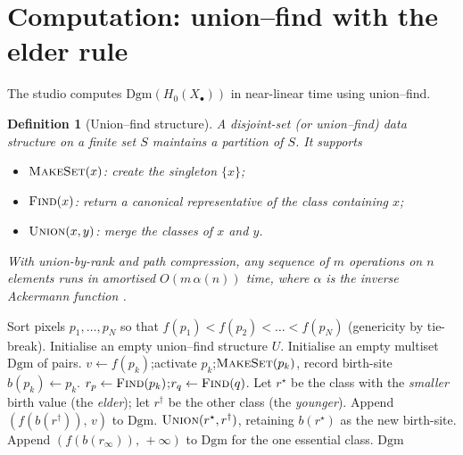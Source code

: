 \documentclass[11pt]{article}
\theoremstyle{persdef}
\newtheorem{definition}{Definition}[section]
\newcommand{\X}{X}
\newcommand{\PD}{\mathrm{Dgm}}
\newcommand{\Hk}[1]{H_{#1}}
\begin{document}
\section{Computation: union--find with the elder rule}

The studio computes $\PD(\Hk{0}(\X_\bullet))$ in near-linear time using union--find.

\begin{definition}[Union--find structure]\label{def:uf}
A \emph{disjoint-set} (or union--find) data structure on a finite set $S$ maintains a partition of $S$. It supports
\begin{itemize}[leftmargin=2em,itemsep=0.2em]
  \item $\textsc{MakeSet}(x)$: create the singleton $\{x\}$;
  \item $\textsc{Find}(x)$: return a canonical representative of the class containing $x$;
  \item $\textsc{Union}(x,y)$: merge the classes of $x$ and $y$.
\end{itemize}
With union-by-rank and path compression, any sequence of $m$ operations on $n$ elements runs in amortised $O(m\,\alpha(n))$ time, where $\alpha$ is the inverse Ackermann function \cite{Tar75}.
\end{definition}

\begin{algorithm}[h!]
\caption{Sublevel $H_0$ persistence via union--find with the elder rule.}\label{alg:H0}
\begin{algorithmic}[1]
\State Sort pixels $p_1,\dots,p_N$ so that $f(p_1)< f(p_2) <\dots< f(p_N)$ (genericity by tie-break).
\State Initialise an empty union--find structure $U$.
\State Initialise an empty multiset $\PD$ of pairs.
  \State $v\gets f(p_k)$;\quad activate $p_k$;\quad $\textsc{MakeSet}(p_k)$, record birth-site $b(p_k)\gets p_k$.
    \State $r_p\gets\textsc{Find}(p_k)$;\quad $r_q\gets\textsc{Find}(q)$.
      \State Let $r^\star$ be the class with the \emph{smaller} birth value (the \emph{elder});
      \State \quad let $r^\dagger$ be the other class (the \emph{younger}).
      \State Append $(f(b(r^\dagger)),\,v)$ to $\PD$.
      \State $\textsc{Union}(r^\star,r^\dagger)$, retaining $b(r^\star)$ as the new birth-site.
    \EndIf
  \EndFor
\EndFor
\State Append $(f(b(r_\infty)),\,+\infty)$ to $\PD$ for the one essential class.
\State \Return $\PD$
\end{algorithmic}
\end{algorithm}
\end{document}
